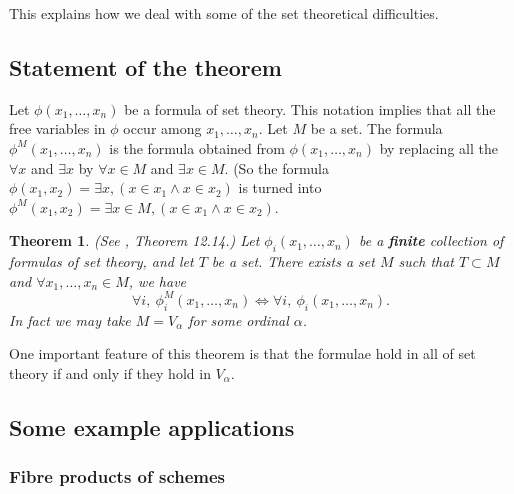 \documentclass{amsart}
\newtheorem{theorem}{Theorem}[subsection]
\theoremstyle{definition}
\theoremstyle{remark}
\numberwithin{equation}{subsection}
\begin{document}
\noindent
This explains how we deal with some of the set theoretical difficulties. 

\subsection{Statement of the theorem}
\label{subsection-reflection-theorem}

\noindent
Let $\phi(x_1,\ldots,x_n)$ be a formula of set theory.
This notation implies that all the free variables in $\phi$
occur among $x_1,\ldots,x_n$. Let $M$ be a set.
The formula $\phi^M(x_1,\ldots,x_n)$ is the formula obtained 
from $\phi(x_1,\ldots,x_n)$ by replacing all the
$\forall x$ and $\exists x$ by $\forall x\in M$ and $\exists x\in M$.
(So the formula $\phi(x_1,x_2) = \exists x, (x\in x_1 \wedge x\in x_2)$
is turned  into
$\phi^M(x_1,x_2) = \exists x \in M, (x\in x_1 \wedge x\in x_2)$.

\begin{theorem}
\label{theorem-reflection-principle}
(See \cite{Jech}, Theorem 12.14.)
Let $\phi_i(x_1,\ldots,x_n)$ be a {\bf finite} collection of
formulas of set theory, and let $T$ be a set.
There exists a set $M$ such that
$T \subset M$ and
$\forall x_1,\ldots,x_n \in M$, we have
$$
\forall i,\  
\phi_i^{M}(x_1,\ldots,x_n)
\Leftrightarrow
\forall i,\  
\phi_i(x_1,\ldots,x_n).
$$
In fact we may take $M = V_\alpha$ for some ordinal $\alpha$.
\end{theorem}

\noindent
One important feature of this theorem is that the
formulae hold in all of set theory if and only if they
hold in $V_\alpha$.

\subsection{Some example applications}
\label{example-reflection-principle}

\subsubsection{Fibre products of schemes}
\end{document}
